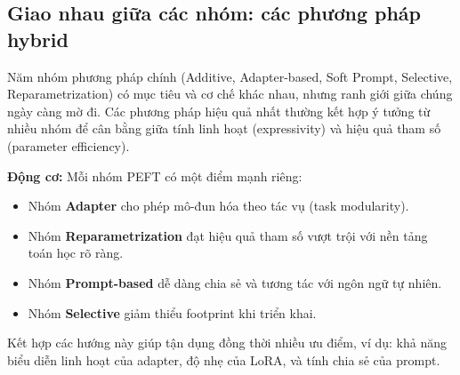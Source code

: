 \subsection{Giao nhau giữa các nhóm: các phương pháp hybrid}
\label{ssec:hybrid}

Năm nhóm phương pháp chính (Additive, Adapter-based, Soft Prompt, Selective, Reparametrization) có mục tiêu và cơ chế khác nhau, nhưng ranh giới giữa chúng ngày càng mờ đi.
Các phương pháp hiệu quả nhất thường kết hợp ý tưởng từ nhiều nhóm để cân bằng giữa tính linh hoạt (expressivity) và hiệu quả tham số (parameter efficiency).

\textbf{Động cơ:}  
Mỗi nhóm PEFT có một điểm mạnh riêng:
\begin{itemize}
	\item Nhóm \textbf{Adapter} cho phép mô-đun hóa theo tác vụ (task modularity).
	\item Nhóm \textbf{Reparametrization} đạt hiệu quả tham số vượt trội với nền tảng toán học rõ ràng.
	\item Nhóm \textbf{Prompt-based} dễ dàng chia sẻ và tương tác với ngôn ngữ tự nhiên.
	\item Nhóm \textbf{Selective} giảm thiểu footprint khi triển khai.
\end{itemize}
Kết hợp các hướng này giúp tận dụng đồng thời nhiều ưu điểm, ví dụ: khả năng biểu diễn linh hoạt của adapter, độ nhẹ của LoRA, và tính chia sẻ của prompt.

